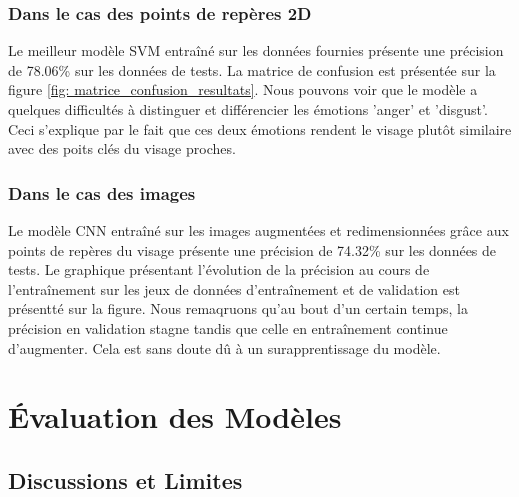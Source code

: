 \documentclass{rapport}
\begin{document}
\subsubsection{Dans le cas des points de repères 2D}

Le meilleur modèle SVM entraîné sur les données fournies présente une précision de 78.06\% sur les données de tests. La matrice de confusion est présentée
sur la figure \ref*{fig: matrice_confusion_resultats}. Nous pouvons voir que le modèle a quelques difficultés à distinguer
et différencier les émotions 'anger' et 'disgust'. Ceci s'explique par le fait que ces deux émotions rendent le visage plutôt similaire avec
des poits clés du visage proches.\\



\subsubsection{Dans le cas des images}
Le modèle CNN entraîné sur les images augmentées et redimensionnées grâce aux points de repères du visage présente une précision
de 74.32\% sur les données de tests. Le graphique présentant l'évolution de la précision au cours de l'entraînement
sur les jeux de données d'entraînement et de validation est présentté sur la figure. Nous remaqruons qu'au bout d'un certain temps, la précision
en validation stagne tandis que celle en entraînement continue d'augmenter. Cela est sans doute dû à un surapprentissage du modèle.


\section{Évaluation des Modèles}
\subsection{Discussions et Limites}
\end{document}
